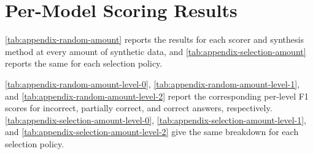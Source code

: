 \section{Per-Model Scoring Results}
\label{app:per-model-results}

\autoref{tab:appendix-random-amount} reports the results for each scorer and synthesis method at every amount of synthetic data, and \autoref{tab:appendix-selection-amount} reports the same for each selection policy.



\autoref{tab:appendix-random-amount-level-0}, \autoref{tab:appendix-random-amount-level-1}, and \autoref{tab:appendix-random-amount-level-2} report the corresponding per-level F1 scores for incorrect, partially correct, and correct answers, respectively. \autoref{tab:appendix-selection-amount-level-0}, \autoref{tab:appendix-selection-amount-level-1}, and \autoref{tab:appendix-selection-amount-level-2} give the same breakdown for each selection policy.


